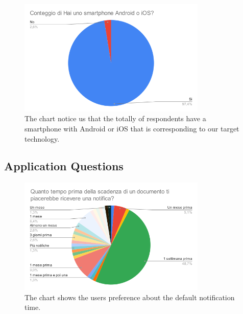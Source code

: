 \begin{figure}[htbp]
	\centering
	\includegraphics[width=0.8\textwidth]{../Draw.io diagrams/Conteggio di Hai uno smartphone Android o iOS_.png}  %
	\caption{The chart notice us that the totally of respondents have a smartphone with Android or iOS that is corresponding to our target technology.}
\end{figure}
\clearpage
\subsection{Application Questions}
\begin{figure}[htbp]
	\centering
	\includegraphics[width=0.8\textwidth]{../Draw.io diagrams/default_date.png}  %
	\caption{The chart shows the users preference about the default notification time.}
\end{figure}

